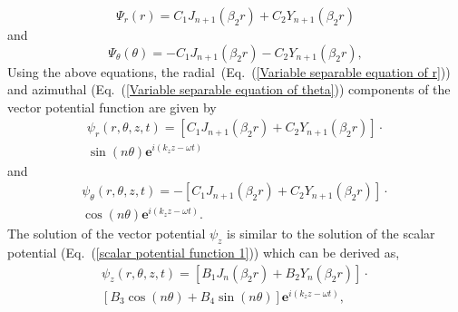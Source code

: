 \documentclass[10pt]{asme2ej}
\begin{document}
\begin{equation}\label{Partial equation of r}
   \Psi_{r}(r) = C_{1}J_{n+1}(\beta_2 r) + C_{2}Y_{n+1}(\beta_2 r) 
\end{equation}
and 
\begin{equation}\label{Partial equation of theta}
    \Psi_{\theta}(\theta) = - C_{1}J_{n+1}(\beta_2 r) - C_{2}Y_{n+1}(\beta_2 r),
\end{equation}
Using the above equations, the radial~(Eq.~(\ref{Variable separable equation of r})) and azimuthal (Eq.~(\ref{Variable separable equation of theta})) components of the vector potential function are given by
\begin{multline}
    \psi_{r}(r,\theta,z,t) = \left[C_{1}J_{n+1}(\beta_2 r) + C_{2}Y_{n+1}(\beta_2 r)\right]\cdot \\ \sin(n\theta)\mathbf{e}^{i(k_{z}z-\omega t)}
\end{multline}
and
\begin{multline}
    \psi_{\theta}(r,\theta,z,t) = -\left[C_{1}J_{n+1}(\beta_2 r) + C_{2}Y_{n+1}(\beta_2 r)\right]\cdot \\ \cos(n\theta)\mathbf{e}^{i(k_{z}z-\omega t)}.
\end{multline}
The solution of the vector potential $\psi_{z}$ is similar to the solution of the scalar potential (Eq.~(\ref{scalar potential function 1})) which can be derived as,
\begin{multline}
   \psi_{z}(r,\theta,z,t) = \left[B_{1}J_{n}(\beta_2 r) + B_{2}Y_{n}(\beta_2r)\right]\cdot \\ \left[B_{3}\cos(n\theta) + B_{4}\sin(n\theta)\right]\mathbf{e}^{i(k_{z}z-\omega t)},
\end{multline}

\end{document}

